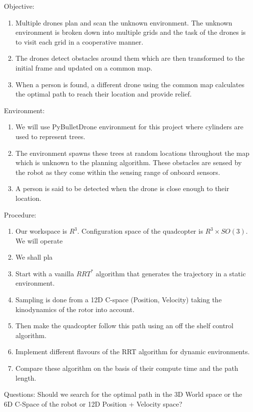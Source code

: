 Objective:
\begin{enumerate}
    \item Multiple drones plan and scan the unknown environment. The unknown environment is broken down into multiple grids and the task of the drones is to visit each grid in a cooperative manner.
    \item The drones detect obstacles around them which are then transformed to the initial frame and updated on a common map.
    \item When a person is found, a different drone using the common map calculates the optimal path to reach their location and provide relief.
\end{enumerate}
Environment:
\begin{enumerate}
    \item We will use PyBulletDrone environment for this project where cylinders are used to represent trees.
    \item The environment spawns these trees at random locations throughout the map which is unknown to the planning algorithm. These obstacles are sensed by the robot as they come within the sensing range of onboard sensors.
    \item A person is said to be detected when the drone is close enough to their location.
\end{enumerate}
Procedure:
\begin{enumerate}
    \item Our workspace is \(R^3\). Configuration space of the quadcopter is \(R^3 \times SO(3)\). We will operate
    \item We shall pla
    \item Start with a vanilla \(RRT^*\) algorithm that generates the trajectory in a static environment.
    \item Sampling is done from a 12D C-space (Position, Velocity) taking the kinodynamics of the rotor into account.
    \item Then make the quadcopter follow this path using an off the shelf control algorithm.
    \item Implement different flavours of the RRT algorithm for dynamic environments. 
    \item Compare these algorithm on the basis of their compute time and the path length.
\end{enumerate}

Questions: Should we search for the optimal path in the 3D World space or the 6D C-Space of the robot or 12D Position + Velocity space?
